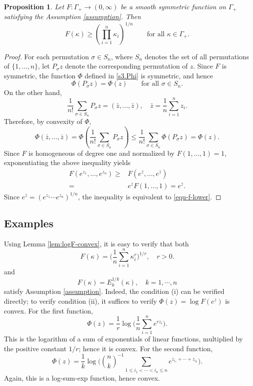 \documentclass[11pt,reqno]{amsart}
\newtheorem{proposition}{Proposition}[section]
\theoremstyle{remark}
\numberwithin{equation}{section}
\begin{document}
\begin{proposition}\label{lem:gm-lower-bound}
 Let $F:\Gamma_+\to (0,\infty)$ be a smooth symmetric function on $\Gamma_+$ satisfying the Assumption \ref{assumption}. Then
\begin{equation}\label{equ-f-lower}
F(\kappa)\ge \left(\prod_{i=1}^n \kappa_i\right)^{1/n}
\qquad \text{for all }\kappa\in \Gamma_+.
\end{equation}
\end{proposition}

\begin{proof}
For each permutation $\sigma\in S_n$, where $S_n$ denotes the set of all permutations of $\{1,\dots,n\}$, let $P_\sigma z$ denote the corresponding permutation of $z$. Since $F$ is symmetric, the function $\Phi$ defined in \eqref{s3.Phi} is symmetric, and hence
\[\Phi(P_\sigma z)=\Phi(z)
\qquad \text{for all }\sigma\in S_n.
\]
On the other hand,
\[\frac1{n!}\sum_{\sigma\in S_n} P_\sigma z=(\bar z,\dots,\bar z),\quad \bar{z}=\frac{1}{n}\sum_{i=1}^nz_i.
\]
Therefore, by convexity of $\Phi$,
\[\Phi(\bar z,\dots,\bar z)
=\Phi\!\left(\frac1{n!}\sum_{\sigma\in S_n}P_\sigma z\right)
\le\frac1{n!}\sum_{\sigma\in S_n}\Phi(P_\sigma z)
=\Phi(z).
\]
Since $F$ is homogeneous of degree one and normalized by $F(1,\dots,1)=1$, exponentiating the above inequality yields
\begin{align*}
    F(e^{z_1},\dots,e^{z_n})\ge &F(e^{\bar z},\dots,e^{\bar z})\\
    =&e^{\bar z}F(1,\dots,1)    =e^{\bar z}.
\end{align*}
Since $e^{\bar z}=(e^{z_1}\cdots e^{z_n})^{1/n}$, the inequality is equivalent to \eqref{equ-f-lower}.
\end{proof}

\subsection{Examples}
Using Lemma \ref{lem:logF-convex}, it is easy to verify that both
\[
F(\kappa)=\Big(\frac1n\sum_{i=1}^n \kappa_i^r\Big)^{1/r},\quad r>0.
\]
and 
\[
F(\kappa)=E_k^{1/k}(\kappa),\quad k=1,\cdots,n
\]
satisfy Assumption \ref{assumption}.  Indeed, the condition (i) can be verified directly; to verify condition (ii), it suffices to verify $\Phi(z)=\log F(e^z)$ is convex. For the first function, 
\[\Phi(z)
=\frac1r\log\Big(\frac1n\sum_{i=1}^n e^{rz_i}\Big).
\]
This is the logarithm of a sum of exponentials of linear functions, multiplied by the positive constant $1/r$; hence it is convex. For the second function, 
\[\Phi(z)
=\frac1k\log\Bigg(
\binom{n}{k}^{-1}
\sum_{1\le i_1<\cdots<i_k\le n}
e^{z_{i_1}+\cdots+z_{i_k}}
\Bigg).
\]
Again, this is a log-sum-exp function, hence convex.
\end{document}
